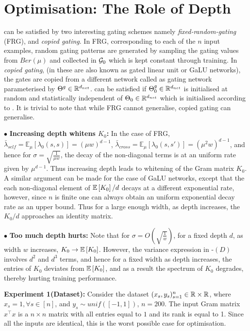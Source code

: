 \section{Optimisation: The Role of Depth}\label{sec:optimisation}

 can be satisfied by two interesting gating schemes namely \emph{fixed-random-gating} (FRG), and \emph{copied gating}. In FRG, corresponding to each of the $n$ input examples, random gating patterns are generated by sampling the gating values from $Ber(\mu)$ and collected in $\mathcal{G}_0$ which is kept constant through training. In \emph{copied gating}, (in \cite{} these are also known as gated linear unit or GaLU networks), the gates are copied from a different network called as gating network parameterised by ${\Theta}^g\in\mathbb{R}^{d_{net}}$.  can be satisfied if ${\Theta}^g_0\in \mathbb{R}^{d_{net}}$ is initialised at random and statistically independent of $\Theta_0\in \mathbb{R}^{d_{net}}$ which is initialised according to . It is trivial to note that while FRG cannot generalise, copied gating can generalise. 
 
$\bullet$ \textbf{Increasing depth whitens $K_0$:} In the case of FRG, $\bar{\lambda}_{self}=\mathbb{E}_{\mu}\left[\lambda_0(s,s)\right]=(\mu w)^{d-1}$, $\bar{\lambda}_{cross}=\mathbb{E}_{\mu}\left[\lambda_0(s,s')\right]= (\mu^2w)^{d-1}$, and hence for $\sigma=\sqrt{\frac{1}{\mu w}}$, the decay of the non-diagonal terms is at an uniform rate given by $\mu^{d-1}$. Thus increasing depth leads to whitening of the Gram matrix $K_0$. A similar argument can be made for the case of GaLU networks, except that the each non-diagonal element of $\mathbb{E}\left[K_0\right]/d$ decays at a different exponential rate, however, since $n$ is finite one can always obtain an uniform exponential decay rate as an upper bound. Thus for a large enough width, as depth increases, the $K_0/d$ approaches an identity matrix.

$\bullet$ \textbf{Too much depth hurts:} Note that for $\sigma=O\left(\sqrt{\frac{1}{w}}\right)$, for a fixed depth $d$, as width $w$ increases, $K_0\rightarrow\mathbb{E}\left[K_0\right]$. However, the variance expression in -$(D)$ involves $d^2$ and $d^3$ terms, and hence for a fixed width as depth increases, the entries of $K_0$ deviates from $\mathbb{E}\left[K_0\right]$, and as a result the spectrum of $K_0$ degrades, thereby hurting training performance.

\textbf{Experiment 1(Dataset):} Consider the dataset $(x_s,y_s)_{s=1}^n\in \mathbb{R}\times \mathbb{R}$, where $x_s=1,\forall s\in [n]$, and $y_s\sim unif([-1,1])$, $n=200$. The input Gram matrix $x^\top x$ is a $n\times n$ matrix with all entries equal to $1$ and its rank is equal to 1. Since all the inputs are identical, this is the worst possible case for optimisation.

